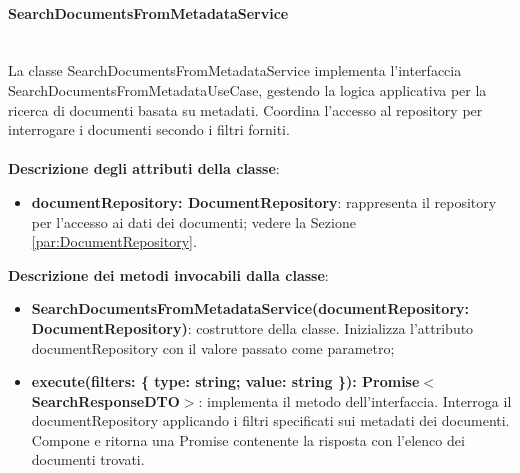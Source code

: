 \documentclass[a4paper,12pt]{article}
\begin{document}
{{{                \paragraph{SearchDocumentsFromMetadataService}\label{par:SearchDocumentsFromMetadataService}\mbox{}\\
                La classe SearchDocumentsFromMetadataService implementa l'interfaccia SearchDocumentsFromMetadataUseCase, gestendo la logica applicativa per la ricerca di documenti basata su metadati. Coordina l'accesso al repository per interrogare i documenti secondo i filtri forniti.\\
                \\
                \textbf{Descrizione degli attributi della classe}:
                \begin{itemize}
                    \item \textbf{documentRepository: DocumentRepository}: rappresenta il repository per l'accesso ai dati dei documenti; vedere la Sezione \ref{par:DocumentRepository}.
                \end{itemize}
                
              \noindent \textbf{Descrizione dei metodi invocabili dalla classe}:
                \begin{itemize}
                    \item \textbf{SearchDocumentsFromMetadataService(documentRepository:\\DocumentRepository)}: costruttore della classe. Inizializza l'attributo documentRepository con il valore passato come parametro;
                    \item \textbf{execute(filters: \{ type: string; value: string \}): Promise$<$SearchResponseDTO$>$}: implementa il metodo dell'interfaccia. Interroga il documentRepository applicando i filtri specificati sui metadati dei documenti. Compone e ritorna una Promise contenente la risposta con l'elenco dei documenti trovati.
                \end{itemize}
}}}
\end{document}
